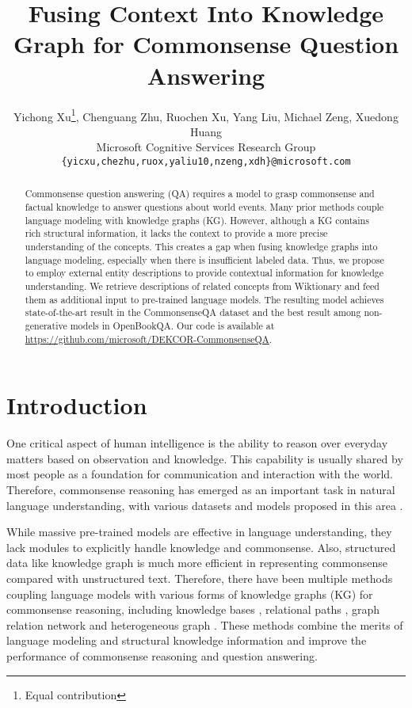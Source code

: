 \documentclass[11pt,a4paper]{article}
\title{Fusing Context Into Knowledge Graph for Commonsense Question Answering}
\author{Yichong Xu\thanks{Equal contribution}, Chenguang Zhu, Ruochen Xu, Yang Liu, Michael Zeng, Xuedong Huang \\
Microsoft Cognitive Services Research Group\\
  \texttt{\{yicxu,chezhu,ruox,yaliu10,nzeng,xdh\}@microsoft.com} \\}
\date{}
\begin{document}
\maketitle
\begin{abstract}
Commonsense question answering (QA) requires a model to grasp commonsense and factual knowledge to answer questions about world events. Many prior methods couple language modeling with knowledge graphs (KG). However, although a KG contains rich structural information, it lacks the context to provide a more precise understanding of the concepts. This creates a gap when fusing knowledge graphs into language modeling, especially when there is insufficient labeled data.
Thus, we propose to employ external entity descriptions to provide contextual information for knowledge understanding. 
We retrieve descriptions of related concepts from Wiktionary and feed them as additional input to pre-trained language models. The resulting model achieves state-of-the-art result in the CommonsenseQA dataset and the best result among non-generative models in OpenBookQA.
Our code is available at \url{https://github.com/microsoft/DEKCOR-CommonsenseQA}.
\end{abstract}


\section{Introduction}
\label{sec:intro}
One critical aspect of human intelligence is the ability to reason over everyday matters based on observation and knowledge. This capability is usually shared by most people as a foundation for communication and interaction with the world.
Therefore, commonsense reasoning has emerged as an important task in natural language understanding, with various datasets and models proposed in this area \citep{ma2019towards,csqa,wang2020connecting,lv2020graph}.

While massive pre-trained models \citep{bert,roberta} are effective in language understanding, they lack modules to explicitly handle knowledge and commonsense. Also, structured data like knowledge graph is much more efficient in representing commonsense compared with unstructured text.
Therefore, there have been multiple methods coupling language models with various forms of knowledge graphs (KG) for commonsense reasoning, including knowledge bases \citep{sap2019atomic,yu2020survey}, relational paths \citep{kagnet}, graph relation network \citep{feng2020scalable} and heterogeneous graph \citep{lv2020graph}. These methods combine the merits of language modeling and structural knowledge information and improve the performance of commonsense reasoning and question answering. 
\end{document}
